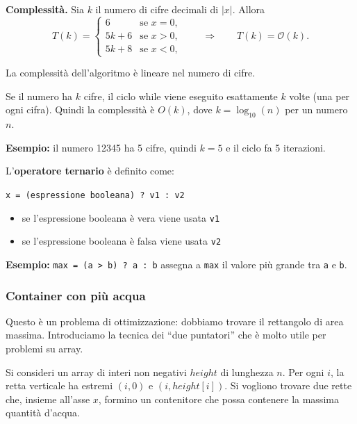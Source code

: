 \textbf{Complessità.}
Sia $k$ il numero di cifre decimali di $|x|$. Allora
\[
T(k) =
\begin{cases}
	6       & \text{se } x = 0,\\
	5k + 6  & \text{se } x > 0,\\
	5k + 8  & \text{se } x < 0,
\end{cases}
\qquad\Rightarrow\qquad
T(k) = \mathcal{O}(k).
\]

\begin{center}
	La complessità dell'algoritmo è lineare nel numero di cifre.
\end{center}

\begin{nota}
	Se il numero ha $k$ cifre, il ciclo while viene eseguito esattamente $k$ volte (una per ogni cifra). Quindi la complessità è $O(k)$, dove $k = \log_{10}(n)$ per un numero $n$.
	
	\textbf{Esempio:} il numero 12345 ha 5 cifre, quindi $k=5$ e il ciclo fa 5 iterazioni.
\end{nota}


\begin{nota}
	L'\textbf{operatore ternario} è definito come:
	
	\texttt{x = (espressione booleana) ? v1 : v2}
	
	\begin{itemize}
		\item se l'espressione booleana è vera viene usata \texttt{v1}
		\item se l'espressione booleana è falsa viene usata \texttt{v2}
	\end{itemize}
	
	\textbf{Esempio:} \texttt{max = (a > b) ? a : b} assegna a \texttt{max} il valore più grande tra \texttt{a} e \texttt{b}.
\end{nota}

\subsubsection*{Container con più acqua}

\begin{softnote}
	Questo è un problema di ottimizzazione: dobbiamo trovare il rettangolo di area massima. Introduciamo la tecnica dei ``due puntatori'' che è molto utile per problemi su array.
\end{softnote}

Si consideri un array di interi non negativi $height$ di lunghezza $n$.
Per ogni $i$, la retta verticale ha estremi $(i,0)$ e $(i,height[i])$.
Si vogliono trovare due rette che, insieme all'asse $x$, formino un
contenitore che possa contenere la massima quantità d'acqua.

